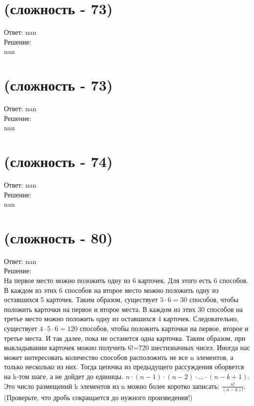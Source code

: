 \documentclass[a4paper,11pt]{article}%
\begin{document}
%
\section{(сложность {-} 73)}%
\label{sec:( {-} 73)}%
\hspace{3ex} Ответ: nan \\%
%
\hspace*{3ex} Решение: \\%
nan

%
\section{(сложность {-} 73)}%
\label{sec:( {-} 73)}%
\hspace{3ex} Ответ: nan \\%
%
\hspace*{3ex} Решение: \\%
nan

%
\section{(сложность {-} 74)}%
\label{sec:( {-} 74)}%
\hspace{3ex} Ответ: nan \\%
%
\hspace*{3ex} Решение: \\%
nan

%
\section{(сложность {-} 80)}%
\label{sec:( {-} 80)}%
\hspace{3ex} Ответ: nan \\%
%
\hspace*{3ex} Решение: \\%
На первое место можно положить одну из 6 карточек. Для этого есть
6 способов. В каждом из этих 6 способов на второе место можно положить одну
из оставшихся 5 карточек. Таким образом, существует $5 \cdot 6=30$ способов, чтобы
положить карточки на первое и второе места. В каждом из этих 30 способов на
третье место можно положить одну из оставшихся 4 карточек. Следовательно,
существует $4 \cdot 5 \cdot 6=120$ способов, чтобы положить карточки на первое, второе
и третье места. И так далее, пока не останется одна карточка. Таким образом,
при выкладывании карточек можно получить 6!=720 шестизначных чисел. Иногда нас может интересовать количество способов расположить не все n
элементов, а только несколько из них. Тогда цепочка из предыдущего
рассуждения оборвется на k-том шаге, а не дойдет до единицы. $n \cdot(n-1) \cdot(n-2) \cdot \ldots \cdot(n-k+1)$. 
Это число размещений k элементов из n можно более коротко записать: $\frac{n !}{(n-k) !}$. (Проверьте, что дробь сокращается до нужного произведения!)
\end{document}

